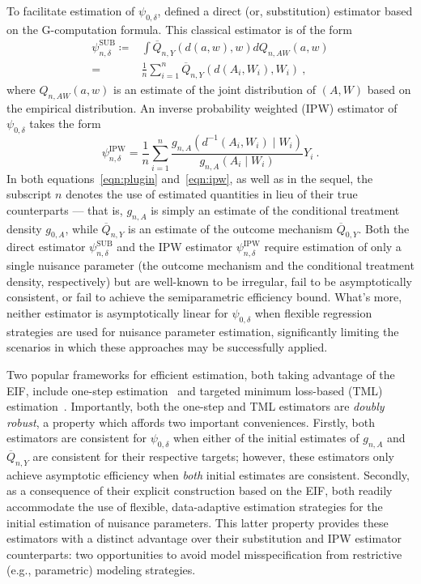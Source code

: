 To facilitate estimation of $\psi_{0,\delta}$, \citet{diaz2018stochastic}
defined a direct (or, substitution) estimator based on the G-computation
formula. This classical estimator is of the form
\begin{align}\label{eqn:plugin}
  \psi_{n,\delta}^{\text{SUB}} \coloneqq&
      \int \overline{Q}_{n,Y}(d(a, w), w) dQ_{n,AW}(a,w) \nonumber \\
      =& \frac{1}{n} \sum_{i=1}^n \overline{Q}_{n,Y}(d(A_i, W_i), W_i)\ ,
\end{align}
where $Q_{n,AW}(a,w)$ is an estimate of the joint distribution of $(A,W)$ based
on the empirical distribution. An inverse probability weighted (IPW) estimator
of $\psi_{0,\delta}$ takes the form
\begin{equation}\label{eqn:ipw}
  \psi_{n,\delta}^{\text{IPW}} = \frac{1}{n} \sum_{i=1}^n \frac{g_{n, A}
    (d^{-1}(A_i, W_i) \mid W_i)}{g_{n, A}(A_i \mid W_i)} Y_i \ .
\end{equation}
In both equations~\eqref{eqn:plugin} and~\eqref{eqn:ipw}, as well as in the
sequel, the subscript $n$ denotes the use of estimated quantities in lieu of
their true counterparts --- that is, $g_{n,A}$ is simply an estimate of the
conditional treatment density $g_{0,A}$, while $\overline{Q}_{n,Y}$ is an
estimate of the outcome mechanism $\overline{Q}_{0,Y}$. Both the direct
estimator $\psi_{n,\delta}^{\text{SUB}}$ and the IPW estimator
$\psi_{n,\delta}^{\text{IPW}}$ require estimation of only a single nuisance
parameter (the outcome mechanism and the conditional treatment density,
respectively) but are well-known to be irregular, fail to be asymptotically
consistent, or fail to achieve the semiparametric efficiency bound. What's more,
neither estimator is asymptotically linear for $\psi_{0,\delta}$ when flexible
regression strategies are used for nuisance parameter estimation, significantly
limiting the scenarios in which these approaches may be successfully applied.

Two popular frameworks for efficient estimation, both taking advantage of the
EIF, include one-step
estimation~\citep{pfanzagl1985contributions,bickel1993efficient} and targeted
minimum loss-based (TML) estimation~\citep{vdl2006targeted, vdl2011targeted,
vdl2018targeted}. Importantly, both the one-step and TML estimators are
\textit{doubly robust}, a property which affords two important conveniences.
Firstly, both estimators are consistent for $\psi_{0,\delta}$ when either of the
initial estimates of $g_{n,A}$ and $\overline{Q}_{n,Y}$ are consistent for their
respective targets; however, these estimators only achieve asymptotic efficiency
when \textit{both} initial estimates are consistent. Secondly, as a consequence
of their explicit construction based on the EIF, both readily accommodate the
use of flexible, data-adaptive estimation strategies for the initial estimation
of nuisance parameters. This latter property provides these estimators with
a distinct advantage over their substitution and IPW estimator counterparts: two
opportunities to avoid model misspecification from restrictive (e.g.,
parametric) modeling strategies.

